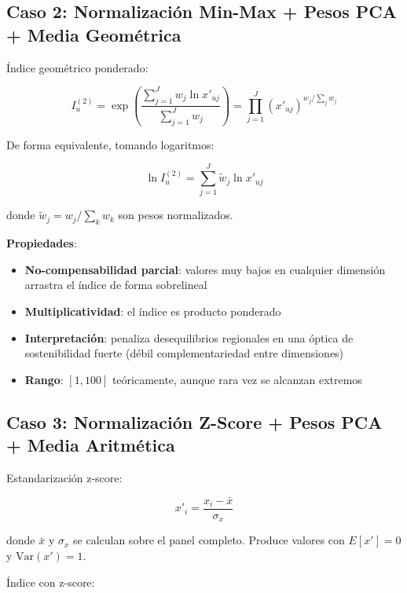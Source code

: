 \subsection{Caso 2: Normalización Min-Max + Pesos PCA + Media Geométrica}

Índice geométrico ponderado:

\begin{equation}
    I_u^{(2)} = \exp\left(\frac{\sum_{j=1}^{J} w_j \ln x'_{uj}}{\sum_{j=1}^{J} w_j}\right) = \prod_{j=1}^{J} (x'_{uj})^{w_j / \sum_j w_j}
    \label{eq:geometrica}
\end{equation}

De forma equivalente, tomando logaritmos:

\begin{equation}
    \ln I_u^{(2)} = \sum_{j=1}^{J} \tilde{w}_j \ln x'_{uj}
\end{equation}

donde $\tilde{w}_j = w_j / \sum_k w_k$ son pesos normalizados.

\textbf{Propiedades}:
\begin{itemize}
    \item \textbf{No-compensabilidad parcial}: valores muy bajos en cualquier dimensión arrastra el índice de forma sobrelineal
    \item \textbf{Multiplicatividad}: el índice es producto ponderado
    \item \textbf{Interpretación}: penaliza desequilibrios regionales en una óptica de sostenibilidad fuerte (débil complementariedad entre dimensiones)
    \item \textbf{Rango}: $[1, 100]$ teóricamente, aunque rara vez se alcanzan extremos
\end{itemize}

\subsection{Caso 3: Normalización Z-Score + Pesos PCA + Media Aritmética}

Estandarización z-score:

\begin{equation}
    x'_i = \frac{x_i - \bar{x}}{\sigma_x}
    \label{eq:zscore}
\end{equation}

donde $\bar{x}$ y $\sigma_x$ se calculan sobre el panel completo. Produce valores con $E[x'] = 0$ y $\text{Var}(x') = 1$.

Índice con z-score:

